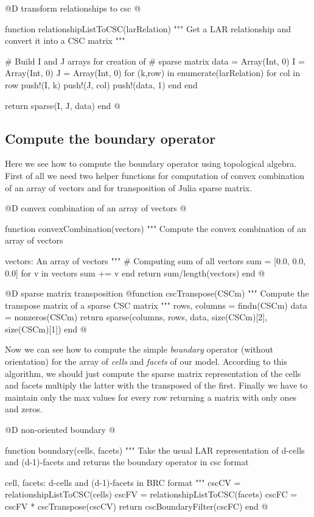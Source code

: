 \documentclass[11pt,oneside]{article}	%
\begin{document}
@D transform relationships to csc
@{function relationshipListToCSC(larRelation)
  """
  Get a LAR relationship
  and convert it into a CSC matrix
  """

  # Build I and J arrays for creation of
  # sparse matrix
  data = Array(Int, 0)
  I = Array(Int, 0)
  J = Array(Int, 0)
  for (k,row) in enumerate(larRelation)
    for col in row
      push!(I, k)
      push!(J, col)
      push!(data, 1)
    end
  end

  return sparse(I, J, data)
end @}

\subsection{Compute the boundary operator}\label{sec:JuliaBoundaryOperator}
Here we see how to compute the boundary operator using topological algebra.
First of all we need two helper functions for computation of convex combination of an array of vectors and for transposition of Julia sparse matrix.

@D convex combination of an array of vectors
@{function convexCombination(vectors)
  """
  Compute the convex combination of an
  array of vectors

  vectors: An array of vectors
  """
  # Computing sum of all vectors
  sum = [0.0, 0.0, 0.0]
  for v in vectors
    sum += v
  end
  return sum/length(vectors)
end @}

@D sparse matrix transposition
@{function cscTranspose(CSCm)
  """
  Compute the transpose matrix of a
  sparse CSC matrix
  """
  rows, columns = findn(CSCm)
  data = nonzeros(CSCm)
  return sparse(columns, rows, data, size(CSCm)[2], size(CSCm)[1])
end @}

Now we can see how to compute the simple \textit{boundary} operator (without orientation) for the array of \textit{cells} and \textit{facets} of our model. According to this algorithm, we should just compute the sparse matrix representation of the cells and facets multiply the latter with the transposed of the first. Finally we have to maintain only the max values for every row returning a matrix with only ones and zeros.

@D non-oriented boundary
@{function boundary(cells, facets)
  """
  Take the usual LAR representation of d-cells
  and (d-1)-facets and returns the
  boundary operator in csc format

  cell, facets: d-cells and (d-1)-facets in BRC format
  """
  cscCV = relationshipListToCSC(cells)
  cscFV = relationshipListToCSC(facets)
  cscFC = cscFV * cscTranspose(cscCV)
  return cscBoundaryFilter(cscFC)
end @}
\end{document}
